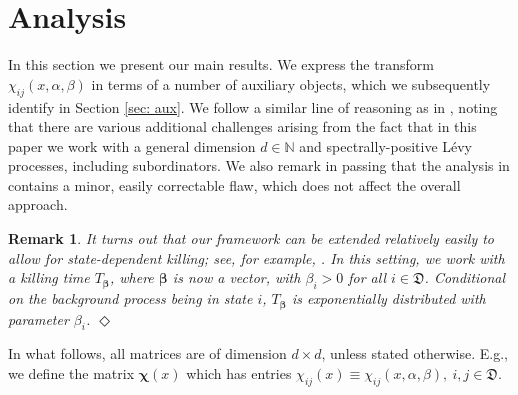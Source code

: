 \documentclass[reqno,12pt]{amsart}
\newcommand{\bs}{\boldsymbol}
\newcommand{\defD}{{\mathfrak D}}
\newcommand{\WS}[1]{{\color{blue}[WS: #1]}}
\newtheorem{remark}{Remark}
\begin{document}
\section{Analysis}\label{sec: analysis}
In this section we present our main results. We express the transform $\chi_{ij}(x,\alpha,\beta)$ in terms of a number of auxiliary objects, which we subsequently identify in Section \ref{sec: aux}. 
We follow a similar line of reasoning as in \cite[Exercise 5.5]{MB}, noting that there are various additional challenges arising from the fact that in this paper we work with a general dimension $d\in{\mathbb N}$ and spectrally-positive Lévy processes, including subordinators. We also remark in passing that the analysis in \cite[Exercise 5.5]{MB} contains a minor, easily correctable flaw, which does not affect the overall approach.

\begin{remark}\label{remark: state dependent killing}
{\em  It turns out that our framework can be extended relatively easily to allow for \emph{state-dependent killing}; see, for example, \cite[\S 3.1]{MB}. In this setting, we work with a killing time $T_{\bs\beta}$, where $\bs\beta$ is now a vector, with $\beta_i>0$ for all $i\in\defD $. 
Conditional on the background process being in state $i$, $T_{\bs\beta}$ is exponentially distributed with parameter $\beta_i$.}
\hfill$\Diamond$
\end{remark}

In what follows, all matrices are of dimension $d\times d$, unless stated otherwise. E.g., we define the matrix $\bs\chi(x)$ which has entries $\chi_{ij}(x) \equiv \chi_{ij}(x,\alpha,\beta),\ i,j\in\defD$.
\end{document}
